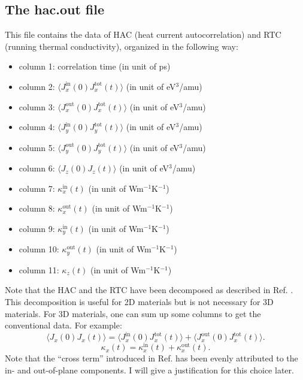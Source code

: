\documentclass[12pt,a4paper]{report}
\begin{document}
\subsection{The hac.out file}

This file contains the data of HAC (heat current autocorrelation) and RTC (running thermal conductivity), organized in the following way:
\begin{itemize}
\item column 1: correlation time (in unit of ps)
\item column 2: $\langle J_x^{\text{in}}(0)J_x^{\text{tot}}(t)\rangle$ (in unit of eV$^3$/amu)
\item column 3: $\langle J_x^{\text{out}}(0)J_x^{\text{tot}}(t)\rangle$ (in unit of eV$^3$/amu)
\item column 4: $\langle J_y^{\text{in}}(0)J_y^{\text{tot}}(t)\rangle$ (in unit of eV$^3$/amu)
\item column 5: $\langle J_y^{\text{out}}(0)J_y^{\text{tot}}(t)\rangle$ (in unit of eV$^3$/amu)
\item column 6: $\langle J_z(0)J_z(t)\rangle$ (in unit of eV$^3$/amu)
\item column 7: $\kappa_x^{\text{in}}(t)$ (in unit of Wm$^{-1}$K$^{-1}$)
\item column 8: $\kappa_x^{\text{out}}(t)$ (in unit of Wm$^{-1}$K$^{-1}$)
\item column 9: $\kappa_y^{\text{in}}(t)$ (in unit of Wm$^{-1}$K$^{-1}$)
\item column 10: $\kappa_y^{\text{out}}(t)$ (in unit of Wm$^{-1}$K$^{-1}$)
\item column 11: $\kappa_z(t)$ (in unit of Wm$^{-1}$K$^{-1}$)
\end{itemize}

Note that the HAC and the RTC have been decomposed as described in Ref. \cite{fan2017prb}. This decomposition is useful for 2D materials but is not necessary for 3D materials. For 3D materials, one can sum up some columns to get the conventional data. For example:
\begin{equation}
\langle J_x(0)J_x(t) \rangle =
\langle J_x^{\text{in}}(0)J_x^{\text{tot}}(t) \rangle +
\langle J_x^{\text{out}}(0)J_x^{\text{tot}}(t) \rangle.
\end{equation}
\begin{equation}
\kappa_x(t) = \kappa_x^{\text{in}}(t) + \kappa_x^{\text{out}}(t).
\end{equation}
Note that the ``cross term'' introduced in Ref. \cite{fan2017prb} has been evenly attributed to the in- and out-of-plane components. I will give a justification for this choice later. 
\end{document}
